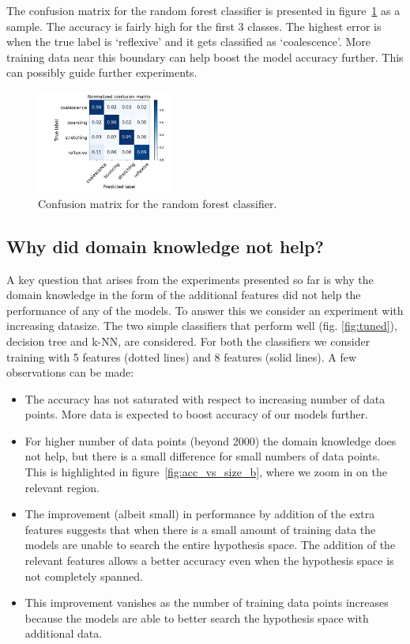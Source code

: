 \documentclass{article}
\begin{document}
The confusion matrix for the random forest classifier is presented in figure~\ref{fig:conf} as a sample. The accuracy is fairly high for the first 3 classes. The highest error is when the true label is `reflexive' and it gets classified as `coalescence'. More training data near this boundary can help boost the model accuracy further. This can possibly guide further experiments.
\begin{figure}[h]
	\centering
	\includegraphics[width=0.4\textwidth]{../figures/conf_mat.png}
	\caption{Confusion matrix for the random forest classifier.}
	\label{fig:conf}
\end{figure}

\subsection{Why did domain knowledge not help?}
A key question that arises from the experiments presented so far is why the domain knowledge in the form of the additional features did not help the performance of any of the models. To answer this we consider an experiment with increasing datasize. The two simple classifiers that perform well (fig. \ref{fig:tuned}), decision tree and k-NN, are considered. For both the classifiers we consider training with 5 features (dotted lines) and 8 features (solid lines). A few observations can be made:
\begin{itemize}
\item The accuracy has not saturated with respect to increasing number of data points. More data is expected to boost accuracy of our models further.
\item For higher number of data points (beyond 2000) the domain knowledge does not help, but there is a small difference for small numbers of data points. This is highlighted in figure~\ref{fig:acc_vs_size_b}, where we zoom in on the relevant region.
\item The improvement (albeit small) in performance by addition of the extra features suggests that when there is a small amount of training data the models are unable to search the entire hypothesis space. The addition of the relevant features allows a better accuracy even when the hypothesis space is not completely spanned.
\item This improvement vanishes as the number of training data points increases because the models are able to better search the hypothesis space with additional data.
\end{itemize}
\end{document}

